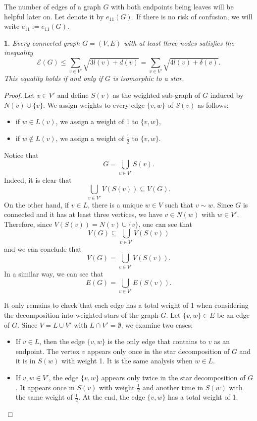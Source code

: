 \documentclass[a4paper]{article}
\newcommand{\energy}[1]{\mathcal{E}\left(#1\right)}
\theoremstyle{plain}
\newtheorem{theorem}{\protect\thmaname}
\renewcommand{\thmaname}{Theorem}%
\renewcommand{\thmaname}{Teorema}%
\begin{document}
The number of edges of a graph $G$ with both endpoints being leaves will be helpful later on. Let denote it by $e_{11}(G)$. If there is no risk of confusion, we will write $e_{11} := e_{11}(G)$.

\begin{theorem}\label{TP}
    Every connected graph \(G = (V,E)\) with at least three nodes satisfies the inequality
    \[
        \energy{G} \leq \sum_{v \in V'} \sqrt{3l(v) + d(v)} = \sum_{v \in V'} \sqrt{4l(v) + \delta(v)}.
    \]
    This equality holds if and only if \(G\) is isomorphic to a star.
    
\end{theorem}

\begin{proof}
    Let \(v \in V'\) and define \(S(v)\) as the weighted sub-graph of \(G\) induced by \(N(v) \cup \{v\}\). We assign weights to every edge \(\{v,w\}\) of \(S(v)\) as follows:
    \begin{itemize}
        \item if \(w \in L(v)\), we assign a weight of 1 to \(\{v,w\}\),
        \item if \(w \notin L(v)\), we assign a weight of \(\frac{1}{2}\) to \(\{v,w\}\).
    \end{itemize}

    Notice that
    \[
        G = \bigcup_{v \in V'} S(v).
    \]
    Indeed, it is clear that
    \[
        \bigcup_{v \in V'} V(S(v)) \subseteq V(G).
    \]
    On the other hand, if \(v \in L\), there is a unique \(w \in V\) such that \(v \sim w\). Since \(G\) is connected and it has at least three vertices, we have \(v \in N(w)\) with \(w \in V'\). Therefore, since \(V(S(v)) = N(v) \cup \{v\}\), one can see that
    \[
        V(G) \subseteq \bigcup_{v \in V'} V(S(v))
    \]
    and we can conclude that
    \[
        V(G) = \bigcup_{v \in V'} V(S(v)).
    \]
    In a similar way, we can see that
    \[
        E(G) = \bigcup_{v \in V'} E(S(v)).
    \]
    
    It only remains to check that each edge has a total weight of 1 when considering the decomposition into weighted stars of the graph \(G\). Let \(\{v,w\} \in E\) be an edge of \(G\). Since \(V = L \cup V'\) with \(L \cap V' = \emptyset\), we examine two cases:
    \begin{itemize}
        \item If \(v \in L\), then the edge \(\{v,w\}\) is the only edge that contains to \(v\) as an endpoint. The vertex \(v\) appears only once in the star decomposition of \(G\) and it is in \(S(w)\) with weight 1. It is the same analysis when \(w \in L\).
        \item If \(v,w \in V'\), the edge \(\{v,w\}\) appears only twice in the star decomposition of \(G\). It appears once in \(S(v)\) with weight \(\frac{1}{2}\) and another time in \(S(w)\) with the same weight of \(\frac{1}{2}\). At the end, the edge \(\{v,w\}\) has a total weight of 1.
    \end{itemize}


\end{proof}
\end{document}
